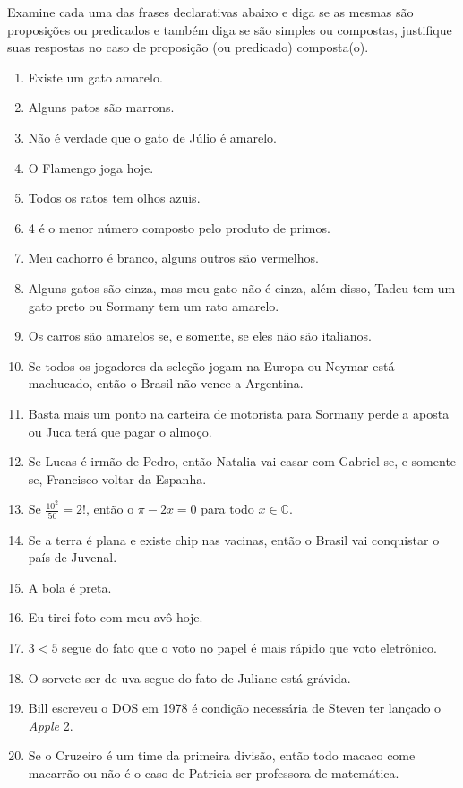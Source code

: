 \begin{problemset}
    \item Examine cada uma das frases declarativas abaixo e diga se as mesmas são proposições ou predicados e também diga se são simples ou compostas, justifique suas respostas no caso de proposição (ou predicado) composta(o).
    \begin{enumerate}
    	\item Existe um gato amarelo.
    	\item Alguns patos são marrons.
    	\item Não é verdade que o gato de Júlio é amarelo.
    	\item O Flamengo joga hoje.
    	\item Todos os ratos tem olhos azuis.
    	\item 4 é o menor número composto pelo produto de primos.
    	\item Meu cachorro é branco, alguns outros são vermelhos.
    	\item Alguns gatos são cinza, mas meu gato não é cinza, além disso, Tadeu tem um gato preto ou Sormany tem um rato amarelo.
    	\item Os carros são amarelos se, e somente, se eles não são italianos.
    	\item Se todos os jogadores da seleção jogam na Europa ou Neymar está machucado, então o Brasil não vence a Argentina.
    	\item Basta mais um ponto na carteira de motorista para Sormany perde a aposta ou Juca terá que pagar o almoço.
    	\item Se Lucas é irmão de Pedro, então Natalia vai casar com Gabriel se, e somente se, Francisco voltar da Espanha.
    	\item Se $\frac{10^2}{50} = 2!$, então o $\pi - 2x = 0$ para todo $x \in \mathbb{C}$.
    	\item Se a terra é plana e existe chip nas vacinas, então o Brasil vai conquistar o país de Juvenal. 
    	\item A bola é preta.
    	\item Eu tirei foto com meu avô hoje.
    	\item $3 < 5$ segue do fato que o  voto no papel é mais rápido que voto eletrônico.
    	\item O sorvete ser de uva segue do fato de Juliane está grávida.
    	\item Bill escreveu o DOS em 1978 é condição necessária de Steven ter lançado o \textit{Apple} 2.
    	\item Se o Cruzeiro é um time da primeira divisão, então todo macaco come macarrão ou não é o caso de Patricia ser professora de matemática. 
    \end{enumerate}


\end{problemset}

